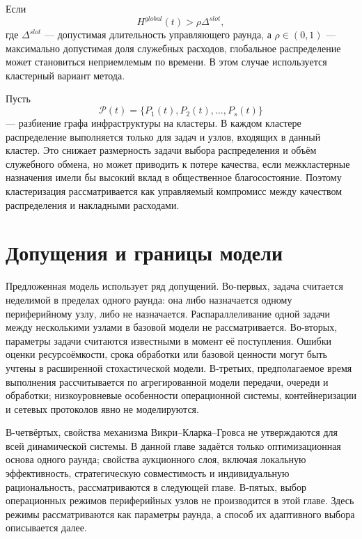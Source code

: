 Если
\begin{equation}
    H^{global}(t)>\rho\Delta^{slot},
    \label{eq:ch2_clustering_condition}
\end{equation}
где $\Delta^{slot}$ --- допустимая длительность управляющего раунда, а $\rho\in(0,1)$ --- максимально допустимая доля служебных расходов, глобальное распределение может становиться неприемлемым по времени. В этом случае используется кластерный вариант метода.

Пусть
\begin{equation}
    \mathcal{P}(t)=\{P_1(t),P_2(t),\ldots,P_s(t)\}
    \label{eq:ch2_partition}
\end{equation}
--- разбиение графа инфраструктуры на кластеры. В каждом кластере распределение выполняется только для задач и узлов, входящих в данный кластер. Это снижает размерность задачи выбора распределения и объём служебного обмена, но может приводить к потере качества, если межкластерные назначения имели бы высокий вклад в общественное благосостояние. Поэтому кластеризация рассматривается как управляемый компромисс между качеством распределения и накладными расходами.

\section{Допущения и границы модели}

Предложенная модель использует ряд допущений. Во-первых, задача считается неделимой в пределах одного раунда: она либо назначается одному периферийному узлу, либо не назначается. Распараллеливание одной задачи между несколькими узлами в базовой модели не рассматривается. Во-вторых, параметры задачи считаются известными в момент её поступления. Ошибки оценки ресурсоёмкости, срока обработки или базовой ценности могут быть учтены в расширенной стохастической модели. В-третьих, предполагаемое время выполнения рассчитывается по агрегированной модели передачи, очереди и обработки; низкоуровневые особенности операционной системы, контейнеризации и сетевых протоколов явно не моделируются.

В-четвёртых, свойства механизма Викри--Кларка--Гровса не утверждаются для всей динамической системы. В данной главе задаётся только оптимизационная основа одного раунда; свойства аукционного слоя, включая локальную эффективность, стратегическую совместимость и индивидуальную рациональность, рассматриваются в следующей главе. В-пятых, выбор операционных режимов периферийных узлов не производится в этой главе. Здесь режимы рассматриваются как параметры раунда, а способ их адаптивного выбора описывается далее.

